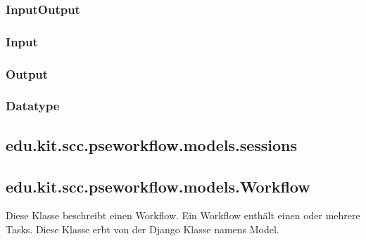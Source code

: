         \subsubsection{InputOutput}
        
        \subsubsection{Input}
        
        \subsubsection{Output}
        
        \subsubsection{Datatype}

    \subsection{edu.kit.scc.pseworkflow.models.sessions}

        \subsection{edu.kit.scc.pseworkflow.models.Workflow}
	        Diese Klasse beschreibt einen Workflow. Ein Workflow enthält einen oder mehrere Tasks. \newline
	        Diese Klasse erbt von der Django Klasse namens \glqq Model\grqq .
                    
